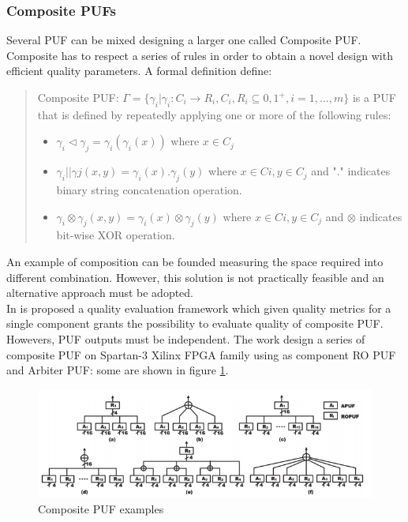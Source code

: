 \documentclass[../tesi.tex]{subfiles}
\begin{document}
\subsubsection{Composite PUFs}
Several PUF can be mixed designing a larger one called Composite PUF. Composite  has to respect a series of rules in order to obtain a novel \puf{} design with efficient quality parameters. A formal definition \cite{sahoo2014composite} define: 
\begin{quote}
Composite PUF: $\Gamma=\{ \gamma_{i}|\gamma_{i}: C_{i} \rightarrow R_{i}, C_{i},R_{i} \subseteq{0,1}^{+}, i = 1,...,m\}$ is a PUF that is defined by repeatedly applying one or more of the following rules:
\begin{itemize}
\item $\gamma_{i} \triangleleft \gamma_{j} = \gamma_{i}(\gamma_{i}(x))$ where $x \in C_{j}$
\item $\gamma_{i} || \gamma{j} (x,y) = \gamma_{i} (x) . \gamma_{j}(y)$ where $x \in C{i}, y \in C_{j}$ and "." indicates binary string concatenation operation. 
\item $\gamma_{i} \otimes \gamma_{j} (x,y) = \gamma_{i}(x) \otimes \gamma_{j}(y)$ where $x \in C{i}, y \in C_{j}$ and $\otimes$ indicates bit-wise XOR operation. 
\end{itemize}
\end{quote}
An example of \puf{} composition can be founded measuring the space required into different \puf{} combination. However, this solution is not practically feasible and an alternative approach must be adopted.\\
In \cite{sahoo2014composite} is proposed a quality evaluation framework which given quality metrics for a single component grants the possibility to evaluate quality of composite PUF. Howevers, PUF outputs must be independent. The work design a series of composite PUF on Spartan-3 Xilinx FPGA family using as component RO PUF and Arbiter PUF: some are shown in figure \ref{fig:compositepuf}. 
\begin{figure}
\centering
\includegraphics[scale=0.50]{images/compositepuf.png}
\caption{Composite PUF examples }
\label{fig:compositepuf}
\end{figure}
\end{document}

